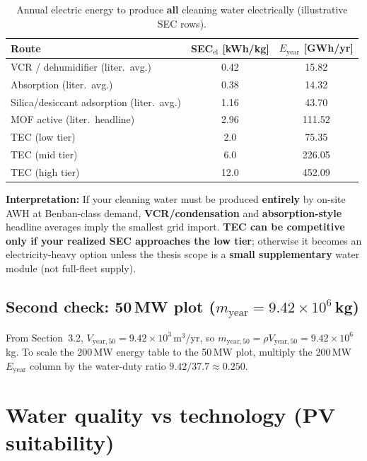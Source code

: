 \documentclass[11pt,a4paper]{article}
\begin{document}
\begin{table}[h]
\centering
\caption{Annual electric energy to produce \textbf{all} cleaning water electrically (illustrative SEC rows).}
\begin{tabular}{@{}lcc@{}}
\toprule
\textbf{Route} & \textbf{SEC$_{\mathrm{el}}$ [kWh/kg]} & \textbf{$E_{\mathrm{year}}$ [GWh/yr]} \\
\midrule
VCR / dehumidifier (liter.\ avg.) & 0.42 & 15.82 \\
Absorption (liter.\ avg.)        & 0.38 & 14.32 \\
Silica/desiccant adsorption (liter.\ avg.) & 1.16 & 43.70 \\
MOF active (liter.\ headline)    & 2.96 & 111.52 \\
TEC (low tier)                   & 2.0  & 75.35 \\
TEC (mid tier)                   & 6.0  & 226.05 \\
TEC (high tier)                  & 12.0 & 452.09 \\
\bottomrule
\end{tabular}
\end{table}

\noindent\textbf{Interpretation:} If your cleaning water must be produced \textbf{entirely} by on-site AWH at Benban-class demand, \textbf{VCR/condensation} and \textbf{absorption-style} headline averages imply the smallest grid import. \textbf{TEC can be competitive only if your realized SEC approaches the low tier}; otherwise it becomes an electricity-heavy option unless the thesis scope is a \textbf{small supplementary} water module (not full-fleet supply).

\subsection{Second check: 50\,MW plot ($m_{\mathrm{year}}=9.42\times 10^6$\,kg)}
From Section~3.2, $V_{\mathrm{year},50}=9.42\times 10^3$\,m$^3$/yr, so $m_{\mathrm{year},50}=\rho V_{\mathrm{year},50}=9.42\times 10^6$\,kg. To scale the 200\,MW energy table to the 50\,MW plot, multiply the 200\,MW $E_{\mathrm{year}}$ column by the water-duty ratio $9.42/37.7\approx 0.250$.

\section{Water quality vs technology (PV suitability)}
\end{document}
